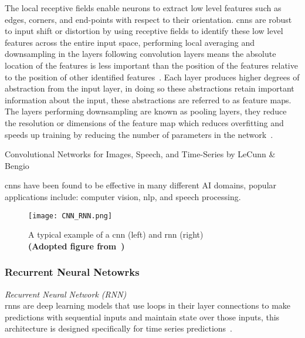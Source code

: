 \documentclass[../../D1.tex]{subfiles}
\begin{document}
The local receptive fields enable neurons to extract low level features such as edges, corners, and end-points with respect to their orientation. 
\Acrshort{cnn}s are robust to input shift or distortion by using receptive fields to identify these low level features across the entire input space, performing local averaging and downsampling in the layers following convolution layers means the absolute location of the features is less important than the position of the features relative to the position of other identified features~\autocite{lecunConvolutionalNetworksImages}. 
Each layer produces higher degrees of abstraction from the input layer, in doing so these abstractions retain important information about the input, these abstractions are referred to as feature maps.
The layers performing downsampling are known as pooling layers, they reduce the resolution or dimensions of the feature map which reduces overfitting and speeds up training by reducing the number of parameters in the network~\autocite{pouyanfarSurveyDeepLearning2019}.

Convolutional Networks for Images, Speech, and Time-Series by LeCunn \& Bengio


\acrshort{cnn}s have been found to be effective in many different AI domains, popular applications include: computer vision, \Acrshort{nlp}, and speech processing. 

\begin{figure}
    \texttt{[image: CNN\_RNN.png]} 
    \caption{A typical example of a \acrshort*{cnn} (left) and \acrshort{rnn} (right)\\ \textbf{(Adopted figure from~\autocite{chenDeepLearningMobile2020})}}
    \label{fig:exampleCnnRnn}   
\end{figure}

\subsubsection{Recurrent Neural Netowrks}
\emph{Recurrent Neural Network (RNN)\\}
\acrshort{rnn}s are deep learning models that use loops in their layer connections to make predictions with sequential inputs and maintain state over those inputs, this architecture is designed specifically for time series predictions~\autocite{chenDeepLearningEdge2019}.
\end{document}
